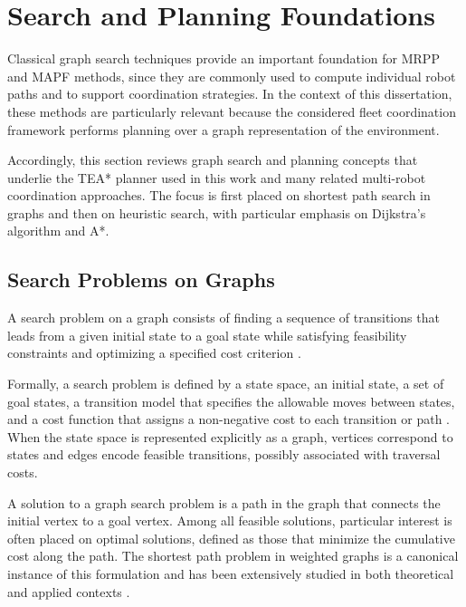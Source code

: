 
\section{Search and Planning Foundations}
\label{sec:single-agent-search}
\hspace{\parindent}
Classical graph search techniques provide an important foundation for MRPP and MAPF methods,
since they are commonly used to compute individual robot paths and to support coordination
strategies. In the context of this dissertation, these methods are particularly relevant because the
considered fleet coordination framework performs planning over a graph representation of the
environment.

Accordingly, this section reviews graph search and planning concepts that underlie the TEA*
planner used in this work and many related multi-robot coordination approaches. The focus is first
placed on shortest path search in graphs and then on heuristic search, with particular emphasis on
Dijkstra's algorithm and A*.



\subsection{Search Problems on Graphs}
\hspace{\parindent}
A search problem on a graph consists of finding a sequence of transitions that leads from a
given initial state to a goal state while satisfying feasibility constraints and optimizing a
specified cost criterion \cite{russell2010aima}.

Formally, a search problem is defined by a state space, an initial state, a set of goal states,
a transition model that specifies the allowable moves between states, and a cost function that
assigns a non-negative cost to each transition or path \cite{russell2010aima}. When the state
space is represented explicitly as a graph, vertices correspond to states and edges encode
feasible transitions, possibly associated with traversal costs.

A solution to a graph search problem is a path in the graph that connects the initial vertex
to a goal vertex. Among all feasible solutions, particular interest is often placed on optimal
solutions, defined as those that minimize the cumulative cost along the path. The shortest path
problem in weighted graphs is a canonical instance of this formulation and has been extensively
studied in both theoretical and applied contexts \cite{cormen2009introduction}.

